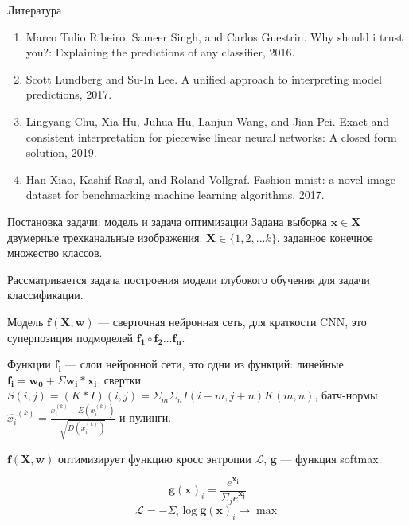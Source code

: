 \documentclass{beamer}
\begin{document}
\begin{frame}{Литература}
\begin{enumerate}
	\item Marco Tulio Ribeiro, Sameer Singh, and Carlos Guestrin. Why should i trust you?: Explaining the
predictions of any classifier, 2016.
	\item Scott Lundberg and Su-In Lee. A unified approach to interpreting model predictions, 2017.
	\item Lingyang Chu, Xia Hu, Juhua Hu, Lanjun Wang, and Jian Pei. Exact and consistent interpretation for
piecewise linear neural networks: A closed form solution, 2019.
	\item Han Xiao, Kashif Rasul, and Roland Vollgraf. Fashion-mnist: a novel image dataset for benchmarking
machine learning algorithms, 2017.
\end{enumerate}
\end{frame}
\begin{frame}{Постановка задачи: модель и задача оптимизации}
Задана выборка $\mathbf{x} \in \mathbf{X}$ двумерные трехканальные изображения. $\mathbf{X} \in \{1, 2, ... k\}$, заданное конечное множество классов.

Рассматривается задача построения модели глубокого обучения для задачи классификации.

Модель $\mathbf{f}(\mathbf{X}, \mathbf{w})$ --- сверточная нейронная сеть, для краткости CNN, это суперпозиция подмоделей $\mathbf{f_1} \circ \mathbf{f_2} \dots \mathbf{f_n}$.

Функции $\mathbf{f_i}$ --- слои нейронной сети, это одни из функций: линейные $\mathbf{f_i} = \mathbf{w_0} + \Sigma \mathbf{w_i} * \mathbf{x_i}$, свертки $S(i,j) = (K * I)(i,j) = \Sigma_m \Sigma_n I(i + m, j + n)K(m, n)$, батч-нормы $\hat{x_i}^{(k)} = \frac{x_i^{(k)} - E(x_i^{(k)})}{\sqrt{D(x_i^{(k)})}}$ и пулинги.

$\mathbf{f}(\mathbf{X}, \mathbf{w})$ оптимизирует функцию кросс энтропии $\mathcal{L}$, $\mathbf{g}$ --- функция softmax.

$$\mathbf{g}(\mathbf{x})_i = \frac{e^{\mathbf{x_i}}}{\Sigma_j e^{\mathbf{x_j}}}$$
$$\mathcal{L} = -\Sigma_i \log \mathbf{g}(\mathbf{x})_i \to \max$$

\end{frame}
\end{document}
